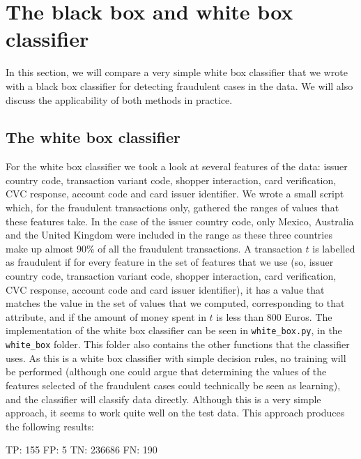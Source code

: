\documentclass[]{article}
\begin{document}
\section{The black box and white box classifier}
In this section, we will compare a very simple white box classifier that we wrote with a black box classifier for detecting fraudulent cases in the data. We will also discuss the applicability of both methods in practice.
\subsection{The white box classifier}
For the white box classifier we took a look at several features of the data: issuer country code, transaction variant code, shopper interaction, card verification, CVC response, account code and card issuer identifier. We wrote a small script which, for the fraudulent transactions only, gathered the ranges of values that these features take. In the case of the issuer country code, only Mexico, Australia and the United Kingdom were included in the range as these three countries make up almost 90\% of all the fraudulent transactions. A transaction $t$ is labelled as fraudulent if for every feature in the set of features that we use (so, issuer country code, transaction variant code, shopper interaction, card verification, CVC response, account code and card issuer identifier), it has a value that matches the value in the set of values that we computed, corresponding to that attribute, and if the amount of money spent in $t$ is less than 800 Euros. The implementation of the white box classifier can be seen in \texttt{white\_box.py}, in the \texttt{white\_box} folder. This folder also contains the other functions that the classifier uses. As this is a white box classifier with simple decision rules, no training will be performed (although one could argue that determining the values of the features selected of the fraudulent cases could technically be seen as learning), and the classifier will classify data directly. Although this is a very simple approach, it seems to work quite well on the test data. This approach produces the following results:

\begin{flushleft}
TP: 155 \newline
FP: 5  \newline
TN: 236686 \newline
FN: 190 \newline
\end{flushleft}
\clearpage
\end{document}
